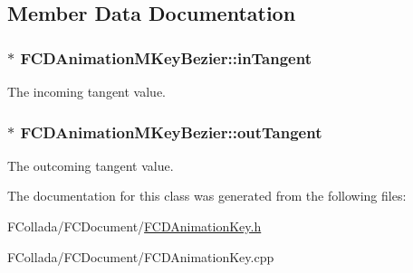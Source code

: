 \subsection{Member Data Documentation}
\hypertarget{classFCDAnimationMKeyBezier_aaf6f55f43516c1bf38cef19ecbb8fe21}{
\subsubsection[{inTangent}]{$\ast$ {\bf FCDAnimationMKeyBezier::inTangent}}}
\label{classFCDAnimationMKeyBezier_aaf6f55f43516c1bf38cef19ecbb8fe21}
The incoming tangent value. \hypertarget{classFCDAnimationMKeyBezier_aea9338c2e0d894e9d5e9a4dcf00928e6}{
\subsubsection[{outTangent}]{$\ast$ {\bf FCDAnimationMKeyBezier::outTangent}}}
\label{classFCDAnimationMKeyBezier_aea9338c2e0d894e9d5e9a4dcf00928e6}
The outcoming tangent value. 

The documentation for this class was generated from the following files:\begin{DoxyCompactItemize}
\item 
FCollada/FCDocument/\hyperlink{FCDAnimationKey_8h}{FCDAnimationKey.h}\item 
FCollada/FCDocument/FCDAnimationKey.cpp\end{DoxyCompactItemize}
